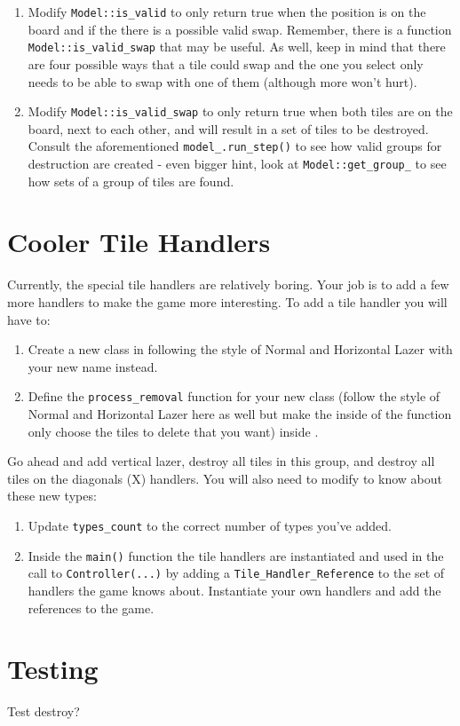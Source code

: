 \documentclass{tufte-handout}
\begin{document}
\begin{enumerate}
  \item Modify \verb!Model::is_valid! to only return true when the position is
    on the board and if the there is a possible valid swap. Remember, there is
    a function \verb!Model::is_valid_swap! that may be useful. As well, keep in
    mind that there are four possible ways that a tile could swap and the one
    you select only needs to be able to swap with one of them (although more
    won't hurt).

  \item Modify \verb!Model::is_valid_swap! to only return true when both tiles
    are on the board, next to each other, and will result in a set of tiles to
    be destroyed. Consult the aforementioned \verb!model_.run_step()! to see how
    valid groups for destruction are created - even bigger hint, look at
    \verb!Model::get_group_! to see how sets of a group of tiles are found.
\end{enumerate}

\section{Cooler Tile Handlers}

Currently, the special tile handlers are relatively boring. Your job is to add
a few more handlers to make the game more interesting. To add a tile handler
you will have to:

\begin{enumerate}
  \item Create a new class in  following the style
    of Normal and Horizontal Lazer with your new name instead.

  \item Define the \verb!process_removal! function for your new class (follow
    the style of Normal and Horizontal Lazer here as well but make the inside
    of the function only choose the tiles to delete that you want) inside
    .
\end{enumerate}

Go ahead and add vertical lazer, destroy all tiles in this group, and
destroy all tiles on the diagonals (X) handlers. You will also need to modify
 to know about these new types:

\begin{enumerate}
    \item Update \verb!types_count! to the correct number of types you've added.

    \item Inside the \verb!main()! function the tile handlers are instantiated
      and used in the call to \verb!Controller(...)! by adding a
      \verb!Tile_Handler_Reference! to the set of handlers the game knows about.
      Instantiate your own handlers and add the references to the game.
\end{enumerate}

\section{Testing}

Test destroy?
\end{document}

